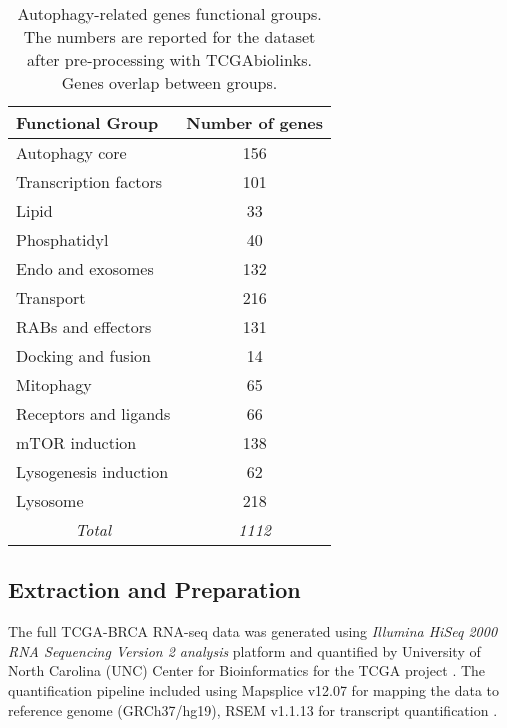     
            \begin{table}[!htbp]
            \centering
            \caption{Autophagy-related genes functional groups. The numbers are reported for the dataset after pre-processing with TCGAbiolinks. Genes overlap between groups. }
            \label{table:autophagy}
            \begin{tabular}{l|c}
            \small
            \textbf{Functional Group} & \multicolumn{1}{l}{\textbf{Number of genes}} \\ \hline
            Autophagy core & 156 \\ \hline
            Transcription factors & 101 \\ \hline
            Lipid & 33 \\ \hline
            Phosphatidyl & 40 \\ \hline
            Endo and exosomes & 132 \\ \hline
            Transport & 216 \\ \hline
            RABs and effectors & 131 \\ \hline
            Docking and fusion & 14 \\ \hline
            Mitophagy & 65 \\ \hline
            Receptors and ligands & 66 \\ \hline
            mTOR induction & 138 \\ \hline
            Lysogenesis induction & 62 \\ \hline
            Lysosome & 218 \\ \hline
            \multicolumn{1}{c|}{\textit{Total}} & \textit{1112}
            \end{tabular}
            \end{table}
            
            
            
            
    \subsection{Extraction and Preparation}
    
    The full TCGA-BRCA RNA-seq data was generated using \textit{Illumina HiSeq 2000 RNA Sequencing Version 2 analysis} platform and quantified by University of North Carolina (UNC) Center for Bioinformatics for the TCGA project \cite{UniversityofNorthCarolinaUNCCenterforBioinfromatics2013TCGAData}. The quantification pipeline included  using Mapsplice v12.07 \cite{wang2010mapsplice} for mapping the data to reference genome (GRCh37/hg19), RSEM v1.1.13 \cite{li2011rsem} for transcript quantification \cite{UniversityofNorthCarolinaUNCCenterforBioinfromatics2013TCGAData}. 

